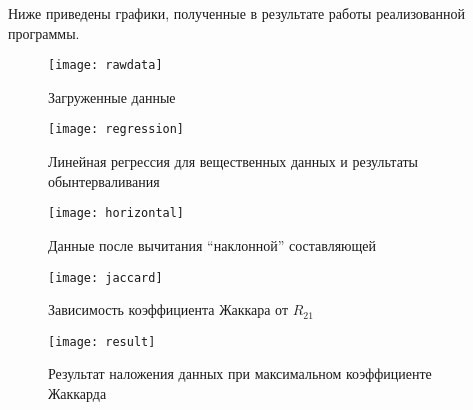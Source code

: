 Ниже приведены графики, полученные в результате работы реализованной программы.

\begin{figure}[H]
	\begin{center}
		\texttt{[image: rawdata]}
		\label{pic:rawdata}
		\caption{Загруженные данные}
	\end{center}
\end{figure}

\begin{figure}[H]
	\begin{center}
		\texttt{[image: regression]}
		\label{pic:regression}
		\caption{Линейная регрессия для вещественных данных и результаты обынтерваливания}
	\end{center}
\end{figure}

\begin{figure}[H]
	\begin{center}
		\texttt{[image: horizontal]}
		\label{pic:horizontal}
		\caption{Данные после вычитания ``наклонной'' составляющей}
	\end{center}
\end{figure}

\begin{figure}[H]
	\begin{center}
		\texttt{[image: jaccard]}
		\label{pic:jaccard}
		\caption{Зависимость коэффициента Жаккара от $R_{21}$}
	\end{center}
\end{figure}

\begin{figure}[H]
	\begin{center}
		\texttt{[image: result]}
		\label{pic:result}
		\caption{Результат наложения данных при максимальном коэффициенте Жаккарда}
	\end{center}
\end{figure}